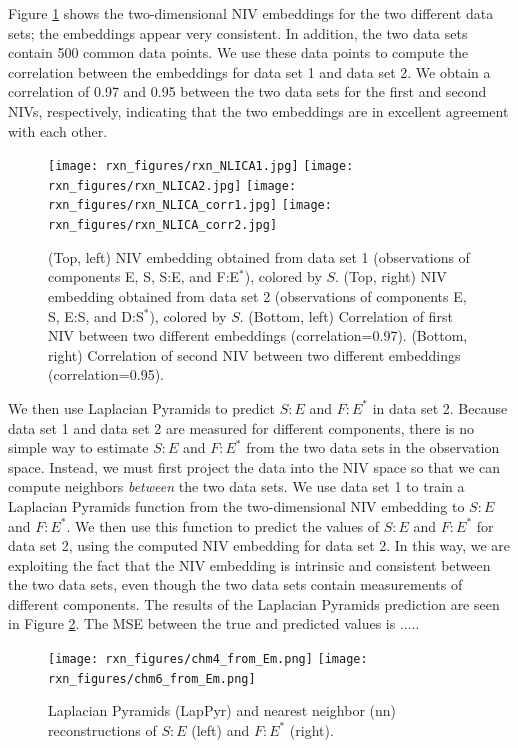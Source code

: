 \documentclass[twocolumn]{revtex4}
\begin{document}
Figure \ref{fig:rxn_embedding} shows the two-dimensional NIV embeddings for the two different data sets; the embeddings appear very consistent.
%
In addition, the two data sets contain 500 common data points.
%
We use these data points to compute the correlation between the embeddings for data set 1 and data set 2.
%
We obtain a correlation of 0.97 and 0.95 between the two data sets for the first and second NIVs, respectively, indicating that the two embeddings are in excellent agreement with each other.

\begin{figure}[ht]
    \texttt{[image: rxn\_figures/rxn\_NLICA1.jpg]}
    \texttt{[image: rxn\_figures/rxn\_NLICA2.jpg]}
    \texttt{[image: rxn\_figures/rxn\_NLICA\_corr1.jpg]}
    \texttt{[image: rxn\_figures/rxn\_NLICA\_corr2.jpg]}
    \caption{(Top, left) NIV embedding obtained from data set 1 (observations of components E, S, S:E, and F:E$^{*}$), colored by $S$. (Top, right) NIV embedding obtained from data set 2 (observations of components E, S, E:S, and D:S$^{*}$), colored by $S$. (Bottom, left) Correlation of first NIV between two different embeddings (correlation=0.97). (Bottom, right)  Correlation of second NIV between two different embeddings (correlation=0.95).}
    \label{fig:rxn_embedding}
\end{figure}

We then use Laplacian Pyramids to predict $S:E$ and $F:E^{*}$ in data set 2.
%
Because data set 1 and data set 2 are measured for different components, there is no simple way to estimate $S:E$ and $F:E^{*}$ from the two data sets in the observation space.
%
Instead, we must first project the data into the NIV space so that we can compute neighbors {\em between} the two data sets.
%
We use data set 1 to train a Laplacian Pyramids function from the two-dimensional NIV embedding to $S:E$ and $F:E^{*}$.
%
We then use this function to predict the values  of $S:E$ and $F:E^{*}$ for data set 2, using the computed NIV embedding for data set 2.
%
In this way, we are exploiting the fact that the NIV embedding is intrinsic and consistent between the two data sets, even though the two data sets contain measurements of different components.
%
The results of the Laplacian Pyramids prediction are seen in Figure \ref{fig:rxn_recon}.
%
The MSE between the true and predicted values is .....

\begin{figure}[ht]
    \texttt{[image: rxn\_figures/chm4\_from\_Em.png]}
    \texttt{[image: rxn\_figures/chm6\_from\_Em.png]}
    \caption{Laplacian Pyramids (LapPyr) and nearest neighbor (nn) reconstructions of $S:E$ (left) and $F:E^{*}$ (right).}
    \label{fig:rxn_recon}
\end{figure}
\end{document}
